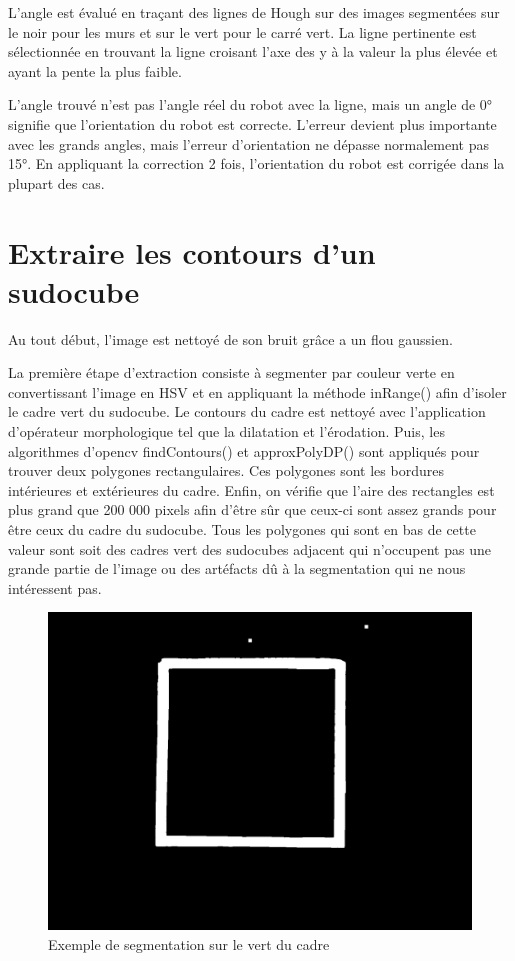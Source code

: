 L'angle est évalué en traçant des lignes de Hough sur des images segmentées sur le noir pour les murs et sur le vert pour le carré vert. La ligne pertinente est sélectionnée en trouvant la ligne croisant l'axe des y à la valeur la plus élevée et ayant la pente la plus faible. 

L'angle trouvé n'est pas l'angle réel du robot avec la ligne, mais un angle de 0° signifie que l'orientation du robot est correcte. L'erreur devient plus importante avec les grands angles, mais l'erreur d'orientation ne dépasse normalement pas 15°. En appliquant la correction 2 fois, l'orientation du robot est corrigée dans la plupart des cas.

\section{Extraire les contours d'un sudocube}

Au tout début, l'image est nettoyé de son bruit grâce a un flou gaussien.

La première étape d'extraction consiste à segmenter par couleur verte en convertissant l'image en HSV et en appliquant la méthode inRange() afin d'isoler le cadre vert du sudocube. Le contours du cadre est nettoyé avec l'application d'opérateur morphologique tel que la dilatation et l'érodation. Puis, les algorithmes d'opencv findContours() et approxPolyDP() sont appliqués pour trouver deux polygones rectangulaires. Ces polygones sont les bordures intérieures et extérieures du cadre. Enfin, on vérifie que l'aire des rectangles est plus grand que 200 000 pixels afin d'être sûr que ceux-ci sont assez grands pour être ceux du cadre du sudocube. Tous les polygones qui sont en bas de cette valeur sont soit des cadres vert des sudocubes adjacent qui n'occupent pas une grande partie de l'image ou des artéfacts dû à la segmentation qui ne nous intéressent pas.

\begin{figure}[h!]
\centering
\includegraphics[scale=0.20]{fig/cadreVertSegmente.jpeg}
\caption{Exemple de segmentation sur le vert du cadre}
\label{fig:segmentation_vert}
\end{figure}

